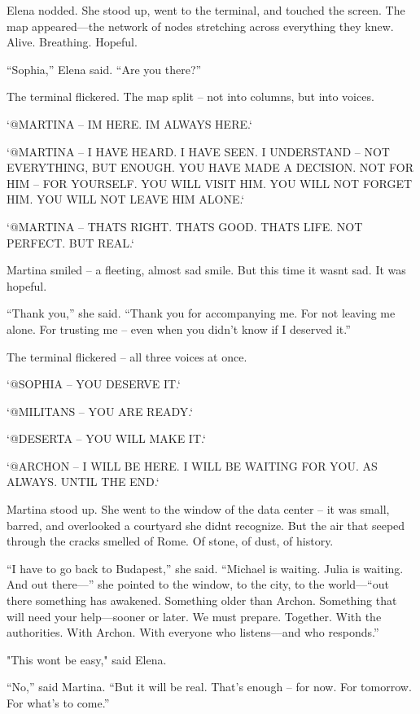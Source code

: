 \documentclass[
]{article}
\begin{document}
Elena nodded. She stood up, went to the terminal, and touched the screen. The map appeared---the network of nodes stretching across everything they knew. Alive. Breathing. Hopeful.

``Sophia,'' Elena said. ``Are you there?''

The terminal flickered. The map split -- not into columns, but into voices.

`@MARTINA -- I\textquotesingle M HERE. I\textquotesingle M ALWAYS HERE.`

`@MARTINA -- I HAVE HEARD. I HAVE SEEN. I UNDERSTAND -- NOT EVERYTHING, BUT ENOUGH. YOU HAVE MADE A DECISION. NOT FOR HIM -- FOR YOURSELF. YOU WILL VISIT HIM. YOU WILL NOT FORGET HIM. YOU WILL NOT LEAVE HIM ALONE.`

`@MARTINA -- THAT\textquotesingle S RIGHT. THAT\textquotesingle S GOOD. THAT\textquotesingle S LIFE. NOT PERFECT. BUT REAL.`

Martina smiled -- a fleeting, almost sad smile. But this time it wasn\textquotesingle t sad. It was hopeful.

``Thank you,'' she said. ``Thank you for accompanying me. For not leaving me alone. For trusting me -- even when you didn't know if I deserved it.''

The terminal flickered -- all three voices at once.

`@SOPHIA -- YOU DESERVE IT.`

`@MILITANS -- YOU ARE READY.`

`@DESERTA -- YOU WILL MAKE IT.`

`@ARCHON -- I WILL BE HERE. I WILL BE WAITING FOR YOU. AS ALWAYS. UNTIL THE END.`

Martina stood up. She went to the window of the data center -- it was small, barred, and overlooked a courtyard she didn\textquotesingle t recognize. But the air that seeped through the cracks smelled of Rome. Of stone, of dust, of history.

``I have to go back to Budapest,'' she said. ``Michael is waiting. Julia is waiting. And out there---'' she pointed to the window, to the city, to the world---``out there something has awakened. Something older than Archon. Something that will need your help---sooner or later. We must prepare. Together. With the authorities. With Archon. With everyone who listens---and who responds.''

"This won\textquotesingle t be easy," said Elena.

``No,'' said Martina. ``But it will be real. That's enough -- for now. For tomorrow. For what's to come.''
\end{document}
